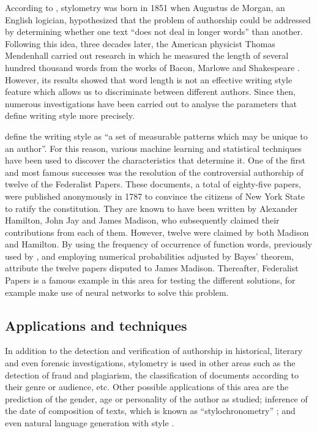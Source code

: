 According to \cite{stylohist}, stylometry was born in 1851 when Augustus de Morgan, an English logician, hypothesized that the problem of authorship could be addressed by determining whether one text ``does not deal in longer words'' \citep{morganletters} than another. Following this idea, three decades later, the American physicist Thomas Mendenhall carried out research in which he measured the length of several hundred thousand words from the works of Bacon, Marlowe and Shakespeare \citep{mendenhall1887}. However, its results showed that word length is not an effective writing style feature which allows us to discriminate between different authors. Since then, numerous investigations have been carried out to analyse the parameters that define writing style more precisely.

\cite{neuronalstylometry} define the writing style as ``a set of measurable patterns which may be unique to an author''. For this reason, various machine learning and statistical techniques have been used to discover the characteristics that determine it. One of the first and most famous successes was the resolution of the controversial authorship of twelve of the Federalist Papers. These documents, a total of eighty-five papers, were published anonymously in 1787 to convince the citizens of New York State to ratify the constitution. They are known to have been written by Alexander Hamilton, John Jay and James Madison, who subsequently claimed their contributions from each of them. However, twelve were claimed by both Madison and Hamilton. By using the frequency of occurrence of function words, previously used by \cite{juniusletters}, and employing numerical probabilities adjusted by Bayes' theorem, \cite{federalistpapers} attribute the twelve papers disputed to James Madison. Thereafter, Federalist Papers is a famous example in this area for testing the different solutions, for example \cite{neuronalstylometry} make use of neural networks to solve this problem.

\subsection{Applications and techniques}\label{ssect:techstylo}
In addition to the detection and verification of authorship in historical, literary and even forensic investigations, stylometry is used in other areas such as the detection of fraud and plagiarism, the classification of documents according to their genre or audience, etc. Other possible applications of this area are the prediction of the gender, age or personality of the author as \cite{schwartz2013personality} studied; inference of the date of composition of texts, which is known as ``stylochronometry'' \citep{stamou2007stylochronometry, juola2007becoming}; and even natural language generation with style \citep[Section 5.1]{nlgsoa}.


